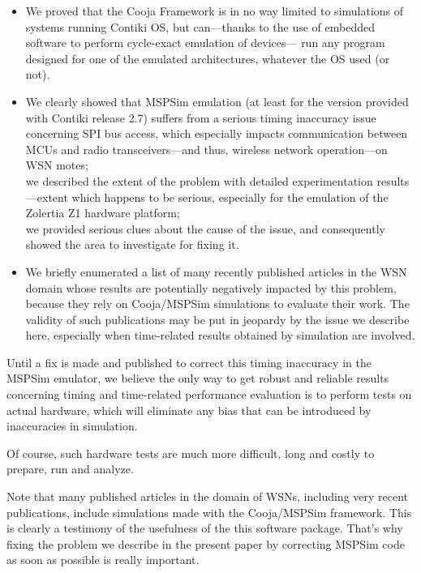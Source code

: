 \documentclass[10pt,emptycopyrightspace]{ewsn-proc}
\begin{document}
\begin{itemize}
\item We proved that the Cooja Framework is in no way limited to simulations
of systems running Contiki OS, but can---thanks to the use of embedded
software to perform cycle-exact emulation of devices--- run any program
designed for one of the emulated architectures, whatever the OS used
(or not).
\item We clearly showed that MSPSim emulation (at least for the version
provided with Contiki release 2.7) suffers from a serious timing
inaccuracy issue concerning SPI bus access, which especially impacts
communication between MCUs and radio transceivers---and thus, wireless
network operation---on WSN motes; \\
we described the extent of the problem with detailed experimentation
results---extent which happens to be serious, especially for the emulation
of the Zolertia Z1 hardware platform; \\
we provided serious clues about the cause of the issue, and
consequently showed the area to investigate for fixing it.
\item We briefly enumerated a list of many recently published articles in the
WSN domain whose results are potentially negatively impacted by this problem,
because they rely on Cooja/MSPSim simulations to evaluate their work.
The validity of such publications may be put in jeopardy by the
issue we describe here, especially when time-related results
obtained by simulation are involved.
\end{itemize}

\bigskip

Until a fix is made and published to correct this timing inaccuracy
in the MSPSim emulator, we believe the only way to get robust and reliable
results concerning timing and time-related performance evaluation is
to perform tests on actual hardware, which will eliminate any bias
that can be introduced by inaccuracies in simulation.

Of course, such hardware tests are much more difficult, long and
costly to prepare, run and analyze.

\medskip

Note that many published articles in the domain of WSNs, including
very recent publications, include simulations made with the Cooja/MSPSim
framework. This is clearly a testimony of the usefulness of the this
software package. That's why fixing the problem we describe in the present
paper by correcting MSPSim code as soon as possible is really important.
\end{document}
